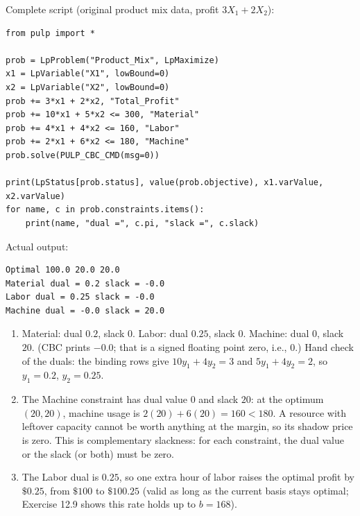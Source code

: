 
Complete script (original product mix data, profit $3X_1 + 2X_2$):

\begin{verbatim}
from pulp import *

prob = LpProblem("Product_Mix", LpMaximize)
x1 = LpVariable("X1", lowBound=0)
x2 = LpVariable("X2", lowBound=0)
prob += 3*x1 + 2*x2, "Total_Profit"
prob += 10*x1 + 5*x2 <= 300, "Material"
prob += 4*x1 + 4*x2 <= 160, "Labor"
prob += 2*x1 + 6*x2 <= 180, "Machine"
prob.solve(PULP_CBC_CMD(msg=0))

print(LpStatus[prob.status], value(prob.objective), x1.varValue, x2.varValue)
for name, c in prob.constraints.items():
    print(name, "dual =", c.pi, "slack =", c.slack)
\end{verbatim}

Actual output:

\begin{verbatim}
Optimal 100.0 20.0 20.0
Material dual = 0.2 slack = -0.0
Labor dual = 0.25 slack = -0.0
Machine dual = -0.0 slack = 20.0
\end{verbatim}

\begin{enumerate}
\item Material: dual $0.2$, slack $0$. Labor: dual $0.25$, slack $0$.
Machine: dual $0$, slack $20$. (CBC prints $-0.0$; that is a signed floating
point zero, i.e., $0$.) Hand check of the duals: the binding rows give
$10y_1 + 4y_2 = 3$ and $5y_1 + 4y_2 = 2$, so $y_1 = 0.2$, $y_2 = 0.25$.
\item The Machine constraint has dual value $0$ and slack $20$: at the
optimum $(20,20)$, machine usage is $2(20) + 6(20) = 160 < 180$. A resource
with leftover capacity cannot be worth anything at the margin, so its shadow
price is zero. This is complementary slackness: for each constraint, the dual
value or the slack (or both) must be zero.
\item The Labor dual is $0.25$, so one extra hour of labor raises the optimal
profit by $\$0.25$, from $\$100$ to $\$100.25$ (valid as long as the current
basis stays optimal; Exercise 12.9 shows this rate holds up to $b = 168$).
\end{enumerate}


